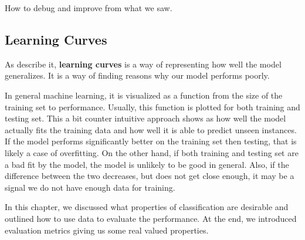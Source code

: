 
How to debug and improve from what we saw.

\subsection{Learning Curves}\label{sec:lcurves}

As \citet{sammut2011encyclopedia} describe it,
\textbf{learning curves} is a way of representing how well the model  generalizes.
It is a way of finding reasons why our model performs poorly.

In general machine learning, it is visualized as a function
from the size of the training set to performance.
Usually, this function is plotted for both training and testing set.
This a bit counter intuitive approach shows as how well the model
actually fits the training data and how well it is able to predict unseen instances.
If the model performs significantly better on the training set then testing,
that is likely a case of overfitting.
On the other hand, if both training and testing set are a bad fit by the model,
the model is unlikely to be good in general.
Also, if the difference between the two decreases, but does not get close enough,
it may be a signal we do not have enough data for training.




In this chapter, we discussed what properties of classification are desirable
and outlined how to use data to evaluate the performance.
At the end, we introduced evaluation metrics giving us some real valued properties.
